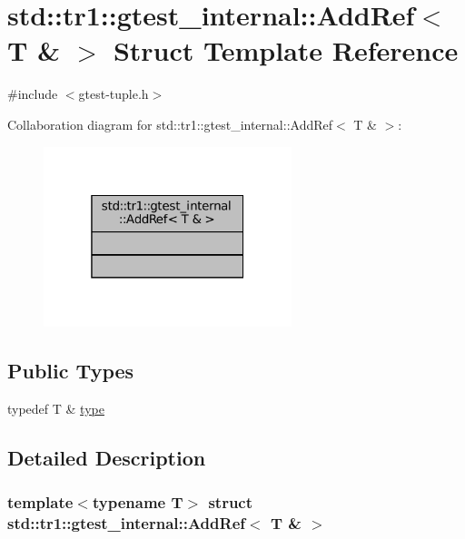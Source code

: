 \hypertarget{structstd_1_1tr1_1_1gtest__internal_1_1AddRef_3_01T_01_6_01_4}{}\section{std\+:\+:tr1\+:\+:gtest\+\_\+internal\+:\+:Add\+Ref$<$ T \& $>$ Struct Template Reference}
\label{structstd_1_1tr1_1_1gtest__internal_1_1AddRef_3_01T_01_6_01_4}


{\ttfamily \#include $<$gtest-\/tuple.\+h$>$}



Collaboration diagram for std\+:\+:tr1\+:\+:gtest\+\_\+internal\+:\+:Add\+Ref$<$ T \& $>$\+:
\nopagebreak
\begin{figure}[H]
\begin{center}
\leavevmode
\includegraphics[width=205pt]{structstd_1_1tr1_1_1gtest__internal_1_1AddRef_3_01T_01_6_01_4__coll__graph}
\end{center}
\end{figure}
\subsection*{Public Types}
\begin{DoxyCompactItemize}
\item 
typedef T \& \hyperlink{structstd_1_1tr1_1_1gtest__internal_1_1AddRef_3_01T_01_6_01_4_a9cb3b0992c2a9e7df42d01fb64c2dc88}{type}
\end{DoxyCompactItemize}


\subsection{Detailed Description}
\subsubsection*{template$<$typename T$>$\newline
struct std\+::tr1\+::gtest\+\_\+internal\+::\+Add\+Ref$<$ T \& $>$}



